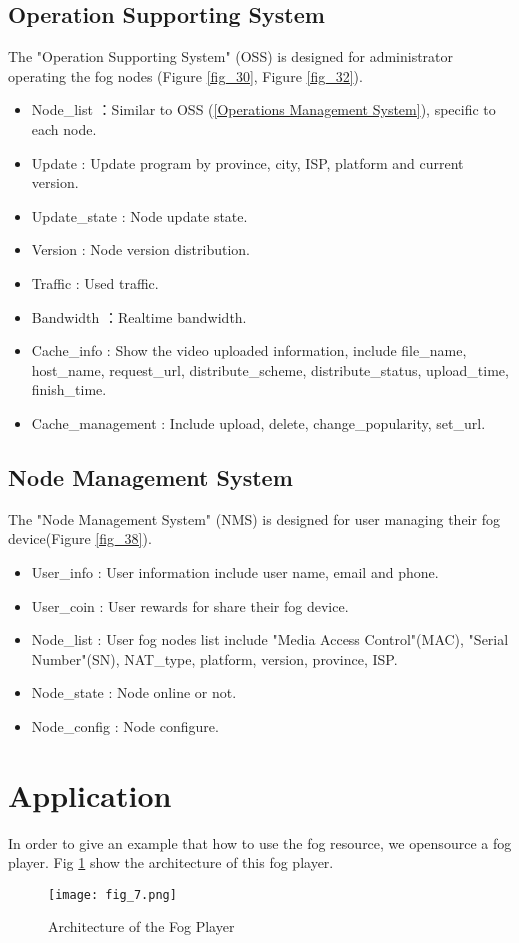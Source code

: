 \subsection{Operation Supporting System}
The "Operation Supporting System" (OSS) is designed for administrator operating the fog nodes
(Figure \ref{fig_30}, Figure \ref{fig_32}).
\begin{itemize}
	\item Node\_list         ：Similar to OSS (\ref{Operations Management System}), specific to each node.
  \item Update             : Update program by province, city, ISP, platform and current version.
  \item Update\_state      : Node update state.
  \item Version            : Node version distribution.
  \item Traffic            : Used traffic.
  \item Bandwidth          ：Realtime bandwidth.
  \item Cache\_info        : Show the video uploaded information, include file\_name, host\_name, request\_url, distribute\_scheme, distribute\_status, upload\_time, finish\_time.
  \item Cache\_management  : Include upload, delete, change\_popularity, set\_url.
\end{itemize}


\subsection{Node Management System}
The "Node Management System" (NMS) is designed for user managing their fog device(Figure \ref{fig_38}).
\begin{itemize}
	\item User\_info     : User information include user name, email and phone.
  \item User\_coin     : User rewards for share their fog device.
  \item Node\_list     : User fog nodes list include "Media Access Control"(MAC), "Serial Number"(SN), NAT\_type, platform, version, province, ISP.
  \item Node\_state    : Node online or not.
  \item Node\_config   : Node configure.
\end{itemize}

\section{Application}
 In order to give an example that how to use the fog resource, we opensource a fog player.
Fig \ref{fig_7} show the architecture of this fog player.
\begin{figure}[htbp]
\centering
	  \texttt{[image: fig\_7.png]}
    \caption{Architecture of the Fog Player}
	  \vskip 1.0cm
 \label{fig_7}
\end{figure}

